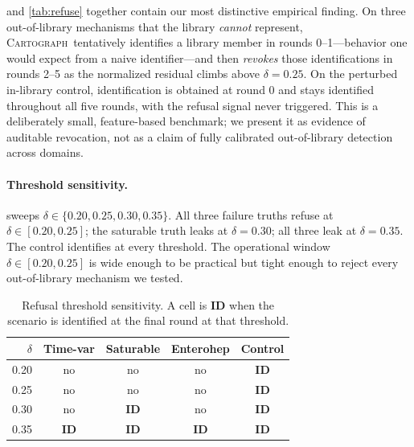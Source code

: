 \documentclass{article}
\newcommand{\method}{\textsc{Cartograph}}
\theoremstyle{plain}
\theoremstyle{definition}
\theoremstyle{remark}
\begin{document}
 and \cref{tab:refuse} together contain our most
distinctive empirical finding. On three out-of-library mechanisms that the
library \emph{cannot} represent, \method\ tentatively identifies a library
member in rounds 0--1---behavior one would expect from a naive identifier---and
then \emph{revokes} those identifications in rounds 2--5 as the
normalized residual climbs above $\delta\!=\!0.25$. On the perturbed
in-library control, identification is obtained at round 0 and stays
identified throughout all five rounds, with the refusal signal never
triggered. This is a deliberately small, feature-based benchmark; we present
it as evidence of auditable revocation, not as a claim of fully calibrated
out-of-library detection across domains.

\paragraph{Threshold sensitivity.}
 sweeps $\delta\in\{0.20,0.25,0.30,0.35\}$.
All three failure truths refuse at $\delta\in[0.20,0.25]$; the saturable
truth leaks at $\delta\!=\!0.30$; all three leak at $\delta\!=\!0.35$. The
control identifies at every threshold. The operational window
$\delta\in[0.20,0.25]$ is wide enough to be practical but tight enough to
reject every out-of-library mechanism we tested.

\begin{table}[t]
\caption{Refusal threshold sensitivity. A cell is \textbf{ID} when the
scenario is identified at the final round at that threshold.}
\label{tab:refusal-thresholds}
\centering
\small
\begin{tabular}{r c c c c}
\toprule
$\delta$ & Time-var & Saturable & Enterohep & Control \\
\midrule
0.20 & no & no & no & \textbf{ID} \\
0.25 & no & no & no & \textbf{ID} \\
0.30 & no & \textbf{ID} & no & \textbf{ID} \\
0.35 & \textbf{ID} & \textbf{ID} & \textbf{ID} & \textbf{ID} \\
\bottomrule
\end{tabular}
\end{table}
\end{document}
